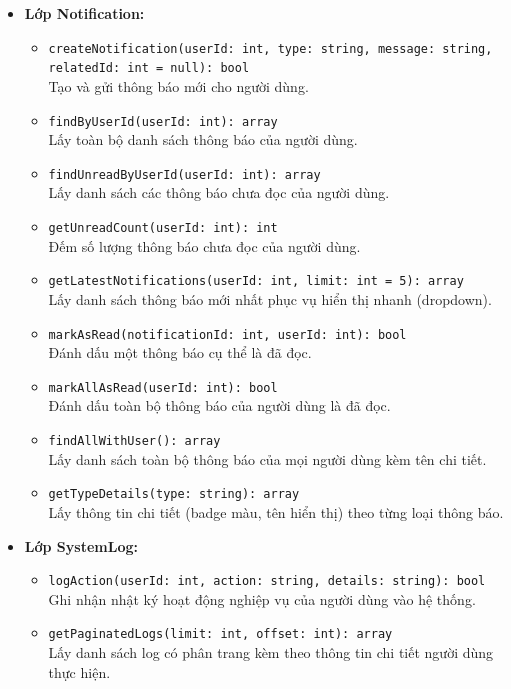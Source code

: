 \begin{itemize}
    \item \textbf{Lớp Notification:}
    \begin{itemize}
        \item \texttt{createNotification(userId: int, type: string, message: string, relatedId: int = null): bool}\\
            Tạo và gửi thông báo mới cho người dùng.
        \item \texttt{findByUserId(userId: int): array}\\
            Lấy toàn bộ danh sách thông báo của người dùng.
        \item \texttt{findUnreadByUserId(userId: int): array}\\
            Lấy danh sách các thông báo chưa đọc của người dùng.
        \item \texttt{getUnreadCount(userId: int): int}\\
            Đếm số lượng thông báo chưa đọc của người dùng.
        \item \texttt{getLatestNotifications(userId: int, limit: int = 5): array}\\
            Lấy danh sách thông báo mới nhất phục vụ hiển thị nhanh (dropdown).
        \item \texttt{markAsRead(notificationId: int, userId: int): bool}\\
            Đánh dấu một thông báo cụ thể là đã đọc.
        \item \texttt{markAllAsRead(userId: int): bool}\\
            Đánh dấu toàn bộ thông báo của người dùng là đã đọc.
        \item \texttt{findAllWithUser(): array}\\
            Lấy danh sách toàn bộ thông báo của mọi người dùng kèm tên chi tiết.
        \item \texttt{getTypeDetails(type: string): array}\\
            Lấy thông tin chi tiết (badge màu, tên hiển thị) theo từng loại thông báo.
    \end{itemize}

    \item \textbf{Lớp SystemLog:}
    \begin{itemize}
        \item \texttt{logAction(userId: int, action: string, details: string): bool}\\
            Ghi nhận nhật ký hoạt động nghiệp vụ của người dùng vào hệ thống.
        \item \texttt{getPaginatedLogs(limit: int, offset: int): array}\\
            Lấy danh sách log có phân trang kèm theo thông tin chi tiết người dùng thực hiện.
    \end{itemize}
\end{itemize}

